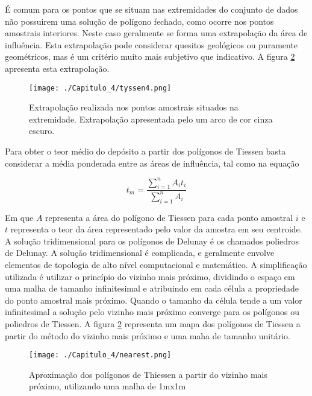 É comum para os pontos que se situam nas extremidades do conjunto de dados não possuirem uma solução de polígono fechado, como ocorre nos pontos amostrais interiores. Neste caso geralmente se forma uma extrapolação da área de influência. Esta extrapolação pode considerar quesitos geológicos ou puramente geométricos, mas é um critério muito mais subjetivo que indicativo. A figura \ref{tiessen3} apresenta esta extrapolação. 

\FloatBarrier
\begin{figure}[!htpb]
	\centering
	\texttt{[image: ./Capitulo\_4/tyssen4.png]}	
	\caption{Extrapolação realizada nos pontos amostrais situados na extremidade. Extrapolação apresentada pelo um arco de cor cinza escuro.}
	\label{tiessen3}
\end{figure}
\FloatBarrier 

Para obter o teor médio do depósito a partir dos polígonos de Tiessen basta considerar a média ponderada entre as áreas de influência, tal como na equação 


\begin{equation} \label{pondemed} 
t_{m} = \frac{\sum_{i=1}^{n} A_{i}t_{i}}{\sum_{i=1}^{n} A_{i}}
\end{equation}

Em que $A$ representa a área do polígono de Tiessen para cada ponto amostral $i$ e $t$ representa o teor da área representado pelo valor da amostra em seu centroide. A solução tridimensional para os polígonos de Delunay é os chamados poliedros de Delunay. A solução tridimensional é complicada, e geralmente envolve elementos de topologia de alto nível computacional e matemático. A simplificação utilizada é utilizar o princípio do vizinho mais próximo, dividindo o espaço em uma malha de tamanho infinitesimal e atribuindo em cada célula a propriedade do ponto amostral mais próximo. Quando o tamanho da célula tende a um valor infinitesimal a solução pelo vizinho mais próximo converge para os polígonos ou poliedros de Tiessen. A figura \ref{tiessen3} representa um mapa dos polígonos de Tiessen a partir do método do vizinho mais próximo e uma maha de tamanho unitário.

\FloatBarrier
\begin{figure}[!htpb]
	\centering
	\texttt{[image: ./Capitulo\_4/nearest.png]}	
	\caption{Aproximação dos polígonos de Thiessen a partir do vizinho mais próximo, utilizando uma malha de 1mx1m}
	\label{tiessen3}
\end{figure}
\FloatBarrier 

